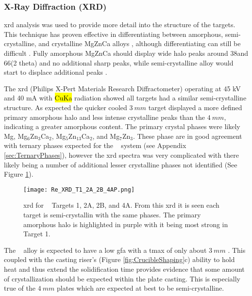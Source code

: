 \documentclass[a4paper,12pt,oneside]{report}%
\begin{document}
\subsubsection{X-Ray Diffraction (XRD)}
\Gls{xrd} analysis was used to provide more detail into the structure of the targets. This technique has proven effective in differentiating between amorphous, semi-crystalline, and crystalline MgZnCa alloys \cite{Schluter2012, Wang2012}, although differentiating can still be difficult \cite{Zhou2013}. Fully amorphous MgZnCa should display wide halo peaks around 38\degree and 66\degree (2 theta) and no additional sharp peaks, while semi-crystalline alloy would start to displace additional peaks \cite{Cao2013b, Gu2005, Wang2012, Gu2010, Cao2012}. 

The \gls{xrd} (Philips X-Pert Materials Research Diffractometer) operating at 45 kV and 40 mA with \hl{CuKa} radiation showed all targets had a similar semi-crystalline structure. As expected the quicker cooled $3~ mm$ target displayed a more defined primary amorphous halo and less intense crystalline peaks than the $4~ mm$, indicating a greater amorphous content. The primary crystal phases were likely Mg, Mg$_{6}$Zn$_{3}$Ca$_{2}$, Mg$_{5}$Zn$_{13}$Ca$_{2}$, and Mg$_{7}$Zn$_{3}$. These phase are in good agreement with ternary phases expected for the \MgZnCa~ system (see Appendix \ref{sec:TernaryPhases}), however the \gls{xrd} spectra was very complicated with there likely being a number of additional lesser crystalline phases not identified (See Figure \ref{fig:XRD_T1_2_4}). 

\begin{figure}[htbp]
	\centering
	\texttt{[image: Re\_XRD\_T1\_2A\_2B\_4AP.png]}
	\caption{\acrshort{xrd} for \MgZnCa~ Targets 1, 2A, 2B, and 4A. From this \acrshort{xrd} it is seen each target is semi-crystallin with the same phases. The primary amorphous halo is highlighted in purple with it being most strong in Target 1.}
	\label{fig:XRD_T1_2_4}
\end{figure}

The \MgZnCa~ alloy is expected to have a low \gls{gfa} with a \gls{tmax} of only about $3~ mm$ \cite{Gu2005}. This coupled with the casting riser's (Figure \ref{fig:CrucibleShaping}c) ability to hold heat and thus extend the solidification time provides evidence that some amount of crystallization should be expected within the plate casting. This is especially true of the $4~ mm$ plates which are expected at best to be semi-crystalline.  
\end{document}
